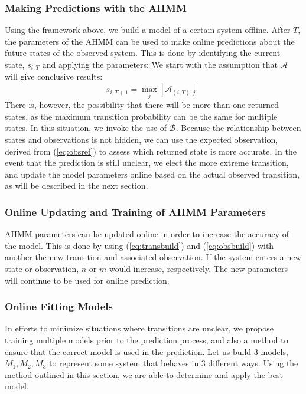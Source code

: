 \documentclass[conference]{IEEEtran}
\begin{document}
\subsubsection{Making Predictions with the AHMM}
 Using the framework above, we build a model of a certain system offline. After $T$, the parameters of the AHMM can be used to make online predictions about the future states of the observed system. This is done by identifying the current state, $s_{i,T}$ and applying the parameters: We start with the assumption that $\mathcal{A}$ will give conclusive results:
\begin{equation} \label{eq:nextstate}
    s_{i,T+1} = \max_{j}[\mathcal{A}_{(i,T),j}]
\end{equation}
There is, however, the possibility that there will be more than one returned states, as the maximum transition probability can be the same for multiple states. In this situation, we invoke the use of $\mathcal{B}$. Because the relationship between states and observations is not hidden, we can use the expected observation, derived from (\ref{eq:obsref}) to assess which returned state is more accurate. In the event that the prediction is still unclear, we elect the more extreme transition, and update the model parameters online based on the actual observed transition, as will be described in the next section.

\subsubsection{Online Updating and Training of AHMM Parameters}
AHMM parameters can be updated online in order to increase the accuracy of the model. This is done by using (\ref{eq:transbuild}) and (\ref{eq:obsbuild}) with another the new transition and associated observation. If the system enters a new state or observation, $n$ or $m$ would increase, respectively. The new parameters will continue to be used for online prediction.

\subsubsection{Online Fitting Models}
In efforts to minimize situations where transitions are unclear, we propose training multiple models prior to the prediction process, and also a method to ensure that the correct model is used in the prediction. Let us build 3 models, $M_1,M_2,M_3$ to represent some system that behaves in 3 different ways. Using the method outlined in this section, we are able to determine and apply the best model.
\end{document}
